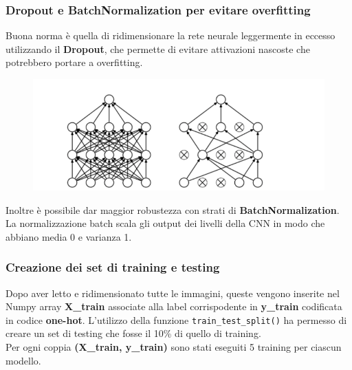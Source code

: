 \documentclass{beamer}
\begin{document}
\begin{frame}
	\frametitle{Dropout e BatchNormalization per evitare overfitting}
		Buona norma è quella di ridimensionare la rete neurale leggermente in eccesso utilizzando il \textbf{Dropout},
		che permette di evitare attivazioni nascoste che potrebbero portare a overfitting. \\
		\begin{figure}
			\includegraphics[width=1\textwidth]{dropout.PNG}
		\end{figure}
		Inoltre è possibile dar maggior robustezza con strati di \textbf{BatchNormalization}.
		La normalizzazione batch scala gli output dei livelli della CNN in modo che abbiano media 0 e varianza 1.\\
	\end{frame}


\begin{frame}[fragile]
\frametitle{Creazione dei set di training e testing}
Dopo aver letto e ridimensionato tutte le immagini, queste vengono inserite nel
Numpy array \textbf{X\_train} associate alla label corrispodente in \textbf{y\_train} 
codificata in codice \textbf{one-hot}.
L'utilizzo della funzione \lstinline{train_test_split()} ha permesso di creare 
un set di testing che fosse il 10\%  di quello di training.\\
Per ogni coppia \textbf{(X\_train, y\_train)} sono stati eseguiti 5 training per ciascun modello.
\end{frame}
\end{document}
